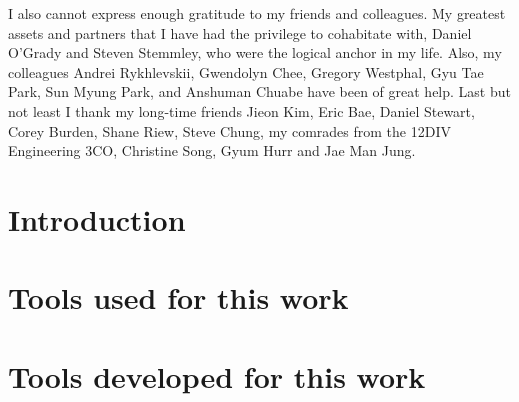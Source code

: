 \documentclass[edeposit,fullpage]{uiucthesis2014}
\begin{document}
I also cannot express enough gratitude to my friends and colleagues. My greatest
assets and partners that I have had the privilege to cohabitate with, Daniel
O'Grady and Steven Stemmley, who were the logical anchor in my life. Also, my colleagues
Andrei Rykhlevskii, Gwendolyn Chee, Gregory Westphal, Gyu Tae Park, Sun Myung Park, and
Anshuman Chuabe have been of great help. Last but not least I thank my long-time friends Jieon Kim,
Eric Bae, Daniel Stewart, Corey Burden, Shane Riew, Steve Chung, my comrades from the 12DIV Engineering 3CO,
Christine Song, Gyum Hurr and Jae Man Jung.



\tableofcontents
\listoftables
\listoffigures


\pagebreak
\mainmatter

\chapter{Introduction}


\chapter{Tools used for this work}



\chapter{Tools developed for this work}

\end{document}
